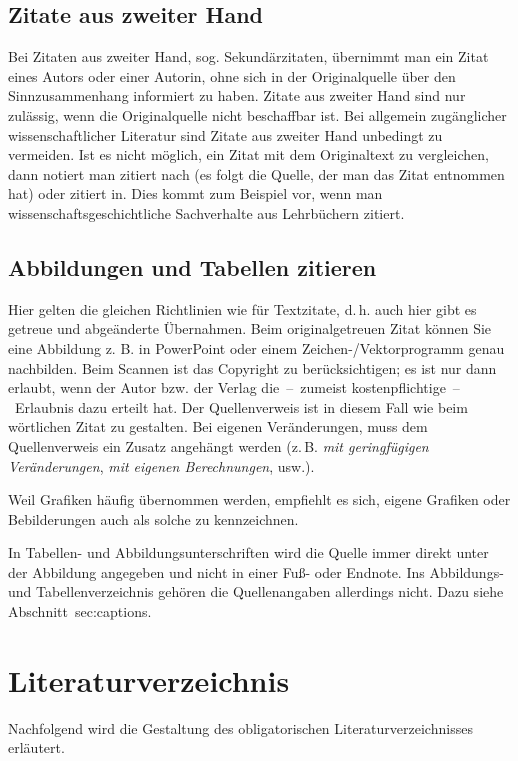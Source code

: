 \subsection{Zitate aus zweiter Hand}
Bei Zitaten aus zweiter Hand, sog. Sekundärzitaten, übernimmt man ein Zitat eines Autors oder einer Autorin, ohne sich in der Originalquelle über den Sinnzusammenhang informiert zu haben. Zitate aus zweiter Hand sind nur zulässig, wenn die Originalquelle nicht beschaffbar ist. Bei allgemein zugänglicher wissenschaftlicher Literatur sind Zitate aus zweiter Hand unbedingt zu vermeiden. Ist es nicht möglich, ein Zitat mit dem Originaltext zu vergleichen, dann notiert man zitiert nach (es folgt die Quelle, der man das Zitat entnommen hat) oder zitiert in. Dies kommt zum Beispiel vor, wenn man wissenschaftsgeschichtliche Sachverhalte aus Lehrbüchern zitiert.
%
\subsection{Abbildungen und Tabellen zitieren}
\label{sec:refFigures}
Hier gelten die gleichen Richtlinien wie für Textzitate, d.\,h. auch hier gibt es getreue und abgeänderte Übernahmen. Beim originalgetreuen Zitat können Sie eine Abbildung z. B. in PowerPoint oder einem Zeichen-/Vektorprogramm genau nachbilden. Beim Scannen ist das Copyright zu berücksichtigen; es ist nur dann erlaubt, wenn der Autor bzw. der Verlag die~--~zumeist kostenpflichtige~--~Erlaubnis dazu erteilt hat. Der Quellenverweis ist in diesem Fall wie beim wörtlichen Zitat zu gestalten. Bei eigenen Veränderungen, muss dem Quellenverweis ein Zusatz angehängt werden (z.\,B. \emph{mit geringfügigen Veränderungen}, \emph{mit eigenen Berechnungen}, usw.).
\par
Weil Grafiken häufig übernommen werden, empfiehlt es sich, eigene Grafiken oder Bebilderungen auch als solche zu kennzeichnen.
\par
In Tabellen- und Abbildungsunterschriften wird die Quelle immer direkt unter der Abbildung angegeben und nicht in einer Fuß- oder Endnote. Ins Abbildungs- und Tabellenverzeichnis gehören die Quellenangaben allerdings nicht. Dazu siehe Abschnitt~sec:captions.
%
%
\section{Literaturverzeichnis}
%
Nachfolgend wird die Gestaltung des obligatorischen Literaturverzeichnisses erläutert.
%
